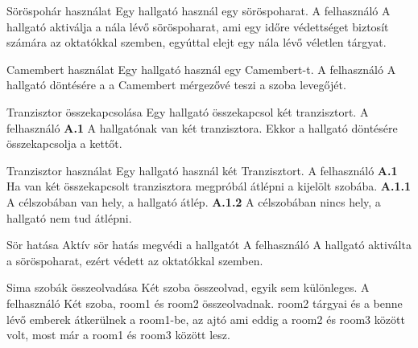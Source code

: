 \begin{use-case}
    {Söröspohár használat}
    {Egy hallgató használ egy söröspoharat.}
    {A felhasználó}
    {A hallgató aktiválja a nála lévő söröspoharat, ami egy időre védettséget biztosít számára az oktatókkal szemben, egyúttal elejt egy nála lévő véletlen tárgyat.}
\end{use-case}

\begin{use-case}
    {Camembert használat}
    {Egy hallgató használ egy Camembert-t.}
    {A felhasználó}
    A hallgató döntésére a a Camembert mérgezővé teszi a szoba levegőjét.
\end{use-case}

\begin{use-case}
    {Tranzisztor összekapcsolása}
    {Egy hallgató összekapcsol két tranzisztort.}
    {A felhasználó}
    \textbf{A.1} A hallgatónak van két tranzisztora. Ekkor a hallgató döntésére összekapcsolja a kettőt.  
\end{use-case}

\begin{use-case}
    {Tranzisztor használat}
    {Egy hallgató használ két Tranzisztort.}
    {A felhasználó}
    \textbf{A.1} Ha van két összekapcsolt tranzisztora megpróbál átlépni a kijelölt szobába.
    \newline \textbf{A.1.1} A célszobában van hely, a hallgató átlép.
    \newline \textbf{A.1.2} A célszobában nincs hely, a hallgató nem tud átlépni.      
\end{use-case}

\begin{use-case}
    {Sör hatása}
    {Aktív sör hatás megvédi a hallgatót}
    {A felhasználó}
    {A hallgató aktiválta a söröspoharat, ezért védett az oktatókkal szemben.}
\end{use-case}

\begin{use-case}
    {Sima szobák összeolvadása}
    {Két szoba összeolvad, egyik sem különleges.}
    {A felhasználó}
    Két szoba, room1 és room2 összeolvadnak. room2 tárgyai és a benne lévő emberek átkerülnek a room1-be, az ajtó ami eddig a room2 és room3 között volt, most már a room1 és room3 között lesz. 
\end{use-case}

